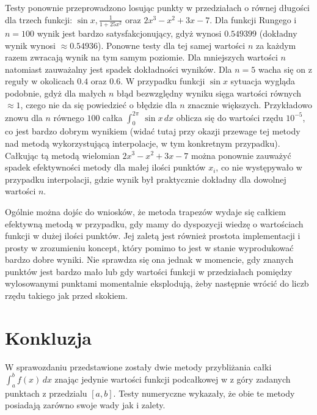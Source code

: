 \documentclass[11pt,wide,leqno]{article}
\begin{document}
        Testy ponownie przeprowadzono losując punkty w przedziałach o równej długości dla trzech funkcji:
        \(\sin x, \frac{1}{1+25x^2}\) oraz \(2x^3 - x^2 + 3x - 7\).
        Dla funkcji Rungego i \(n=100\) wynik jest bardzo satysfakcjonujący, gdyż wynosi \(0.549399\)
        (dokładny wynik wynosi \(\approx 0.54936\)). Ponowne testy dla tej samej wartości \(n\)
        za każdym razem zwracają wynik na tym samym poziomie. Dla mniejszych wartości \(n\) natomiast 
        zauważalny jest spadek dokładności wyników. Dla \(n=5\) wacha się on z reguły w okolicach
        \(0.4\) oraz \(0.6\). W przypadku funkcji \(\sin x\) sytuacja wygląda podobnie, gdyż dla małych \(n\)
        błąd bezwzględny wyniku sięga wartości równych \(\approx 1\), czego nie da się powiedzieć o błędzie dla \(n\) znacznie większych.
        Przykładowo znowu dla \(n\) równego \(100\) całka \(\int_{0}^{2\pi}\ \sin x\,dx\) oblicza się do wartości rzędu 
        \(10^{-5}\), co jest bardzo dobrym wynikiem (widać tutaj przy okazji przewage tej metody nad metodą wykorzystującą interpolacje, w tym konkretnym przypadku).
        Całkując tą metodą wielomian \(2x^3 - x^2 + 3x - 7\) można ponownie zauważyć
        spadek efektywności metody dla małej ilości punktów \(x_i\), co nie występywało w przypadku interpolacji, gdzie wynik 
        był praktycznie dokładny dla dowolnej wartości \(n\).

        Ogólnie można dojśc do wniosków, że metoda trapezów wydaje się całkiem efektywną metodą w przypadku,
        gdy mamy do dyspozycji wiedzę o wartościach funkcji w dużej ilości punktów. Jej zaletą jest również 
        prostota implementacji i prosty w zrozumieniu koncept, który pomimo to jest w stanie wyprodukować
        bardzo dobre wyniki. Nie sprawdza się ona jednak w momencie, gdy znanych punktów jest bardzo mało lub gdy 
        wartości funkcji w przedziałach pomiędzy wylosowanymi punktami momentalnie eksplodują, żeby następnie wrócić
        do liczb rzędu takiego jak przed skokiem. 

    \section{Konkluzja}
        W sprawozdaniu przedstawione zostały dwie metody przybliżania całki \(\int_{a}^{b} f(x)\,dx\) znając jedynie wartości funkcji 
        podcałkowej w z góry zadanych punktach z przedzialu \([a,b]\). Testy numeryczne wykazały, że obie te metody posiadają zarówno swoje 
        wady jak i zalety. 
        
\end{document}
